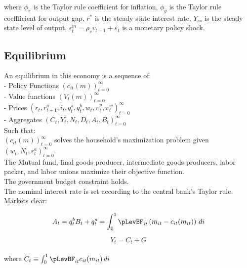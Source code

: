 \documentclass[titlepage]{\econtex}\providecommand{\texname}{BufferStockTheory}
\begin{document}
where $\phi_{\pi}$ is the Taylor rule coefficient for inflation, $\phi_{y}$ is the Taylor rule coeffficient for output gap,  $r^{*}$ is the steady state interest rate, $Y_{ss}$ is the steady state level of output,  $\epsilon^{m}_{t} = \rho_{v} v_{t-1} +\varepsilon_{t}$ is a monetary policy shock. \\

\hypertarget{Equilibrium}{}
\subsection{Equilibrium}


An equilibrium in this economy is a sequence of: \\

- Policy Functions $\left( c_{it}(m) \right )_{t=0}^{\infty}$ \\

- Value functions $ \left( V_{t}(m) \right)_{t=0}^{\infty}$\\

- Prices $ \left(r_{t},  r^{a}_{t+1}, i_{t}, q^{s}_{t}, q^{b}_{t}, w_{t} , \pi^{p}_{t}, \pi^{w}_{t} \right) _{t=0}^{\infty}$\\

- Aggregates $ \left(C_{t}, Y_{t} , N_{t}, D_{t} , A_{t} , B_{t} \right)_{t=0}^{\infty}$\\

Such that: \\

$ \left(  c_{it}(m)\right)_{t=0}^{\infty}$  solves the household's maximization problem given $  \left( w_{t}, N_{t},  r^{a}_{t} \right)_{t=0}^{\infty}$.\\

The Mutual fund, final goods producer, intermediate goods producers, labor packer, and labor unions maximize their objective function. \\

The government budget constraint holds. \\

The nominal interest rate is set according to the central bank's Taylor rule. \\


Markets clear:

 $$ A_t = q^{b}_{t} B_{t} + q^{s}_{t} =  \int_{0}^{1} \pLevBF_{it}\left( m_{it} - c_{it}(m_{it})\right) \, di $$
 
 $$ Y_t = C_{t} +G $$ \\
 
 where $C_{t} \equiv  \int_{0}^{1} \pLevBF_{it} c_{it}(m_{it})\, di $
\end{document}
